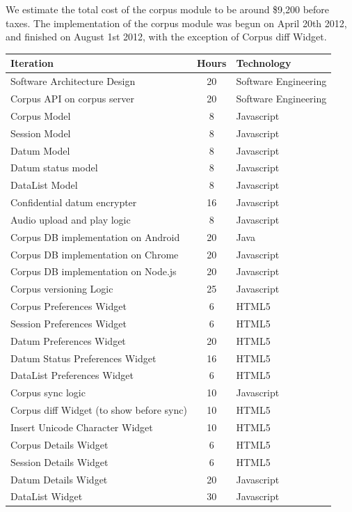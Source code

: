 \documentclass[12pt]{article}
\begin{document}
We estimate the total cost of the corpus module to be around \$9,200 before taxes. The implementation of the corpus module was begun on April 20th 2012, and finished on August 1st 2012, with the exception of Corpus diff Widget.
\begin{table}[htbp]
\begin{center}
  \begin{tabular}{ | lcl | }
\hline

Iteration&  Hours&  Technology  \\
\hline
Software Architecture Design& 20& Software Engineering  \\ 
Corpus API on corpus server&  20& Software Engineering\\ 
Corpus Model& 8&  Javascript  \\ 
Session Model&  8&  Javascript  \\ 
Datum Model&  8&  Javascript  \\ 
Datum status model& 8&  Javascript  \\ 
DataList Model& 8&  Javascript  \\ 
Confidential datum encrypter& 16& Javascript  \\ 
Audio upload and play logic&  8&  Javascript  \\ 
Corpus DB  implementation on Android& 20& Java  \\ 
Corpus DB  implementation on Chrome&  20& Javascript  \\ 
Corpus DB  implementation on Node.js& 20& Javascript \\ 
Corpus versioning Logic&  25& Javascript  \\ 
Corpus Preferences Widget&  6&  HTML5 \\ 
Session Preferences Widget& 6&  HTML5 \\ 
Datum Preferences Widget& 20& HTML5 \\ 
Datum Status Preferences Widget&  16& HTML5 \\ 
DataList Preferences Widget&  6&  HTML5 \\ 
Corpus sync logic&  10&  Javascript \\ 
Corpus diff Widget (to show before sync)& 10&  HTML5 \\ 
Insert Unicode Character Widget&  10&  HTML5 \\ 
Corpus Details Widget&  6&  HTML5 \\
Session Details Widget& 6&  HTML5 \\  
Datum Details Widget& 20&  Javascript \\ 
DataList Widget&  30&  Javascript \\ 

\end{tabular}
\end{center}
\end{table}
\end{document}
